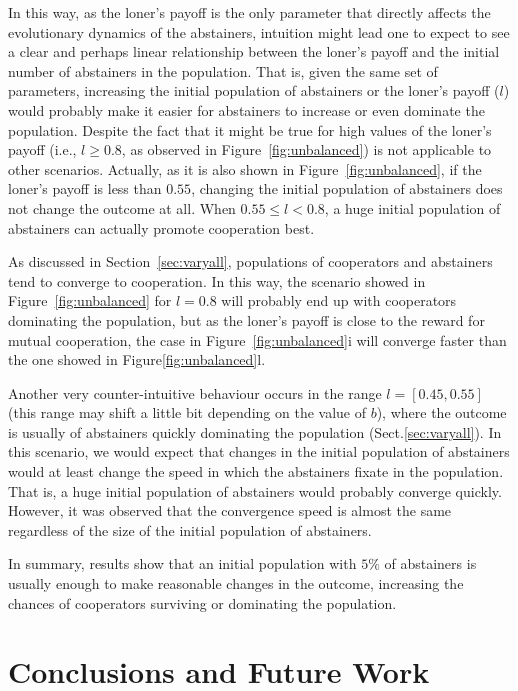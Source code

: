 \documentclass{llncs}
\begin{document}
In this way, as the loner’s payoff is the only parameter that directly affects
the evolutionary dynamics of the abstainers, intuition might lead one to expect
to see a clear and perhaps linear relationship between the loner’s payoff and
the initial number of abstainers in the population. That is, given the same set
of parameters, increasing the initial population of abstainers or the loner’s
payoff ($l$) would probably make it easier for abstainers to increase or even
dominate the population. Despite the fact that it might be true for high values
of the loner’s payoff (i.e., $l\ge0.8$, as observed in Figure~\ref{fig:unbalanced})
is not applicable to other scenarios. Actually, as it is also shown in
Figure~\ref{fig:unbalanced}, if the loner’s payoff is less than $0.55$,
changing the initial population of abstainers does not change the outcome at
all. When $0.55 \le l < 0.8$, a huge initial population of abstainers can
actually promote cooperation best.

As discussed in Section~\ref{sec:varyall}, populations of cooperators and
abstainers tend to converge to cooperation. In this way, the scenario showed in
Figure~\ref{fig:unbalanced} for $l=0.8$  will probably end up with cooperators
dominating the population, but as the loner’s payoff is close to the reward for
mutual cooperation, the case in Figure~\ref{fig:unbalanced}i will converge
faster than the one showed in Figure\ref{fig:unbalanced}l.

Another very counter-intuitive behaviour occurs in the range $l=[0.45, 0.55]$
(this range may shift a little bit depending on the value of $b$), where the
outcome is usually of abstainers quickly dominating the population
(Sect.\ref{sec:varyall}). In this scenario, we would expect that changes in the
initial population of abstainers would at least change the speed in which the
abstainers fixate in the population. That is, a huge initial population of
abstainers would probably converge quickly. However, it was observed that the
convergence speed is almost the same regardless of the size of the initial
population of abstainers.

In summary, results show that an initial population with $5\%$ of abstainers
is usually enough to make reasonable changes in the outcome, increasing the
chances of cooperators surviving or dominating the population.


\section{Conclusions and Future Work}
\label{sec:conclusion}
\end{document}
